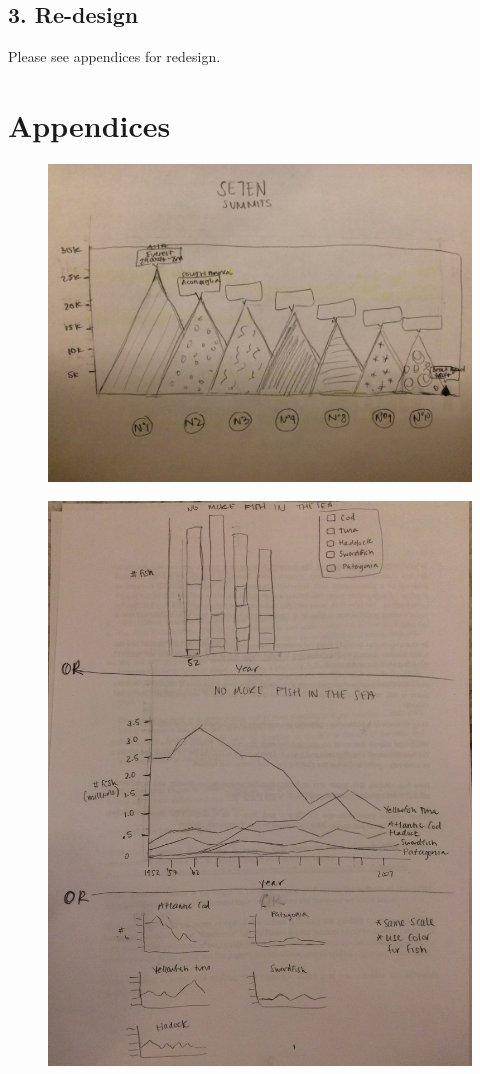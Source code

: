 \documentclass{neu_handout}
\begin{document}
\subsection*{3. Re-design}

Please see appendices for redesign.



\newpage

\appendix
\section{Appendices}

\begin{figure}[h]
\centering
{
\includegraphics[width=0.5\linewidth]{part2_1}
}
\end{figure}


\begin{figure}[h]
\centering
{
\includegraphics[width=0.4\linewidth]{part2_2}
}
\end{figure}
\end{document}
